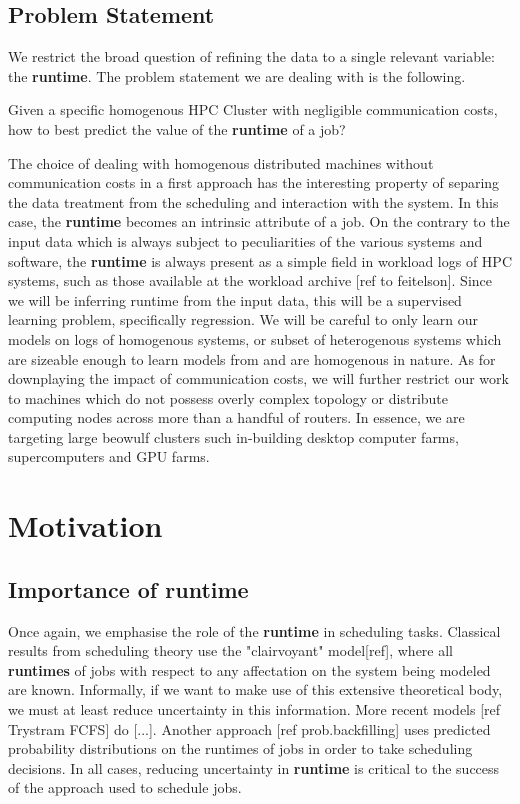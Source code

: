 \documentclass{article}
\begin{document}
\subsection{Problem Statement}
We restrict the broad question of refining the data to a single relevant variable: the \textbf{runtime}. The problem statement we are dealing with is the following.

Given a specific homogenous HPC Cluster with negligible communication costs, how to best predict the value of the \textbf{runtime} of a job?

The choice of dealing with homogenous distributed machines without communication costs in a first approach has the interesting property of separing the data treatment from the scheduling and interaction with the system.
In this case, the \textbf{runtime} becomes an intrinsic attribute of a job. On the contrary to the input data which is always subject to peculiarities of the various systems and software, the \textbf{runtime} is always present as a simple field in workload logs of HPC systems, such as those available at the workload archive [ref to feitelson].
Since we will be inferring runtime from the input data, this will be a supervised learning problem, specifically regression.
We will be careful to only learn our models on logs of homogenous systems, or subset of heterogenous systems which are sizeable enough to learn models from and are homogenous in nature.
As for downplaying the impact of communication costs, we will further restrict our work to machines which do not possess overly complex topology or distribute computing nodes across more than a handful of routers.
In essence, we are targeting large beowulf clusters such in-building desktop computer farms, supercomputers and GPU farms.

\section{Motivation}

\subsection{Importance of \textbf{runtime}}
\label{sub:importance_of_runtime}
Once again, we emphasise the role of the \textbf{runtime} in scheduling tasks. Classical results from scheduling theory use the "clairvoyant" model[ref], where all \textbf{runtimes} of jobs with respect to any affectation on the system being modeled are known.
Informally, if we want to make use of this extensive theoretical body, we must at least reduce uncertainty in this information.
More recent models [ref Trystram FCFS] do [...].
Another approach [ref prob.backfilling] uses predicted probability distributions on the runtimes of jobs in order to take scheduling decisions.
In all cases, reducing uncertainty in \textbf{runtime} is critical to the success of the approach used to schedule jobs.
\end{document}
